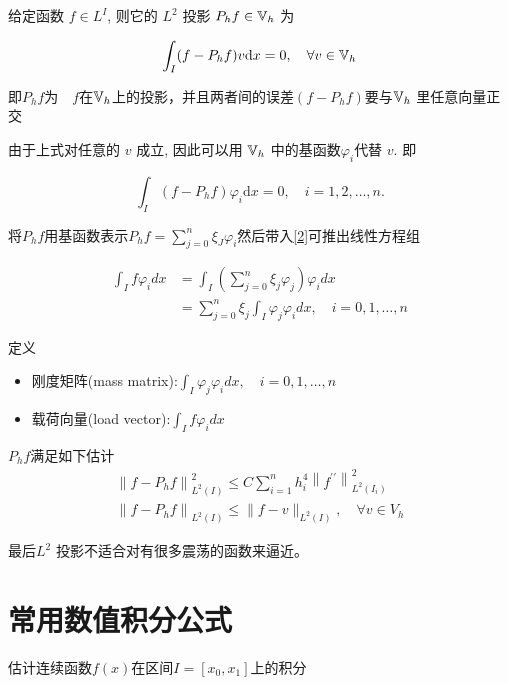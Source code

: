 \documentclass{article}
\begin{document}
给定函数 $f \in L^{I}$, 则它的 $L^2$ 投影 $P_hf \in {\mathbb V}_h$ 为

\begin{equation}
    \int_I (f - P_hf)v \mathrm{d} x = 0, \quad \forall v \in {\mathbb V}_h
\end{equation}

即$ P_hf $为　$ f $在$ {\mathbb V}_h $上的投影，并且两者间的误差$ (f - P_hf) $要与$ {\mathbb V}_h $
里任意向量正交

由于上式对任意的 $v$ 成立, 因此可以用 ${\mathbb V}_h$ 中的基函数$  \varphi_i $代替 $v$. 即

\begin{equation}\label{2}
    \int_I (f - P_hf)\varphi_i \mathrm{d} x = 0, \quad i = 1, 2, \ldots, n.
\end{equation}

将$  P_hf $用基函数表示$ P_hf= \sum_{j=0}^n\xi_J\varphi_i $然后带入\ref{2}可推出线性方程组

\begin{equation}
\begin{aligned}
\int_{I} f \varphi_{i} d x &=\int_{I}\left(\sum_{j=0}^{n} \xi_{j} \varphi_{j}\right) \varphi_{i} d x \\
&=\sum_{j=0}^{n} \xi_{j} \int_{I} \varphi_{j} \varphi_{i} d x, \quad i=0,1, \ldots, n
\end{aligned}
\end{equation}

定义
\begin{itemize}
\item 刚度矩阵(mass matrix):$ \int_{I}\varphi_{j} \varphi_{i} d x, \quad i=0,1, \ldots, n$
\item 载荷向量(load vector):$  \int_{I} f \varphi_{i} d x $
\end{itemize}

\begin{proposition}

$ P_{h} f $满足如下估计
\begin{align*}
\left\|f-P_{h} f\right\|_{L^{2}(I)}^{2} \leq C \sum_{i=1}^{n} h_{i}^{4}\left\|f^{\prime \prime}\right\|_{L^{2}\left(I_{i}\right)}^{2} \\
\left\|f-P_{h} f\right\|_{L^{2}(I)} \leq\|f-v\|_{L^{2}(I)}, \quad \forall v \in V_{h}
\end{align*}

\end{proposition}

最后$L^2$ 投影不适合对有很多震荡的函数来逼近。
\section{常用数值积分公式}
估计连续函数$f(x)$在区间$I = \left[x_0,x_1\right]$上的积分
\end{document}
